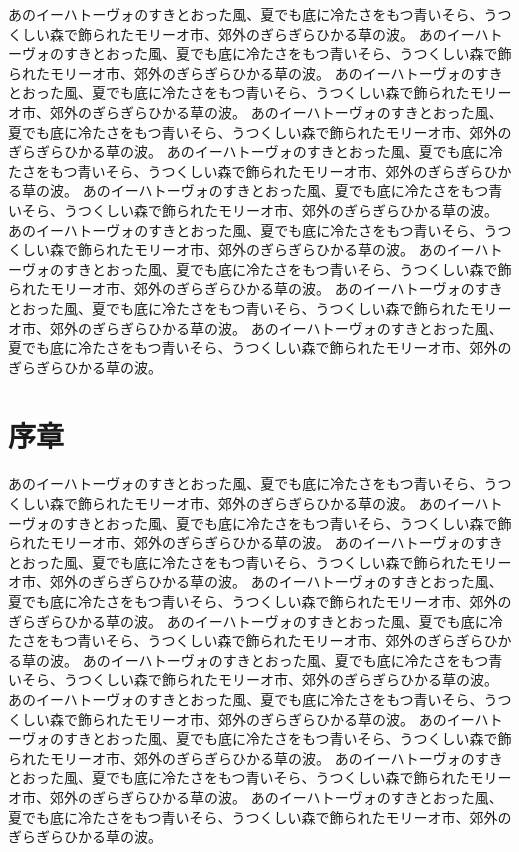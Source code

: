 \documentclass[b5j]{jsbook}
\begin{document}
あのイーハトーヴォのすきとおった風、夏でも底に冷たさをもつ青いそら、うつくしい森で飾られたモリーオ市、郊外のぎらぎらひかる草の波。
あのイーハトーヴォのすきとおった風、夏でも底に冷たさをもつ青いそら、うつくしい森で飾られたモリーオ市、郊外のぎらぎらひかる草の波。
あのイーハトーヴォのすきとおった風、夏でも底に冷たさをもつ青いそら、うつくしい森で飾られたモリーオ市、郊外のぎらぎらひかる草の波。
あのイーハトーヴォのすきとおった風、夏でも底に冷たさをもつ青いそら、うつくしい森で飾られたモリーオ市、郊外のぎらぎらひかる草の波。
あのイーハトーヴォのすきとおった風、夏でも底に冷たさをもつ青いそら、うつくしい森で飾られたモリーオ市、郊外のぎらぎらひかる草の波。
あのイーハトーヴォのすきとおった風、夏でも底に冷たさをもつ青いそら、うつくしい森で飾られたモリーオ市、郊外のぎらぎらひかる草の波。
あのイーハトーヴォのすきとおった風、夏でも底に冷たさをもつ青いそら、うつくしい森で飾られたモリーオ市、郊外のぎらぎらひかる草の波。
あのイーハトーヴォのすきとおった風、夏でも底に冷たさをもつ青いそら、うつくしい森で飾られたモリーオ市、郊外のぎらぎらひかる草の波。
あのイーハトーヴォのすきとおった風、夏でも底に冷たさをもつ青いそら、うつくしい森で飾られたモリーオ市、郊外のぎらぎらひかる草の波。
あのイーハトーヴォのすきとおった風、夏でも底に冷たさをもつ青いそら、うつくしい森で飾られたモリーオ市、郊外のぎらぎらひかる草の波。

\tableofcontents
\mainmatter
{}

\chapter{序章}

あのイーハトーヴォのすきとおった風、夏でも底に冷たさをもつ青いそら、うつくしい森で飾られたモリーオ市、郊外のぎらぎらひかる草の波。
あのイーハトーヴォのすきとおった風、夏でも底に冷たさをもつ青いそら、うつくしい森で飾られたモリーオ市、郊外のぎらぎらひかる草の波。
あのイーハトーヴォのすきとおった風、夏でも底に冷たさをもつ青いそら、うつくしい森で飾られたモリーオ市、郊外のぎらぎらひかる草の波。
あのイーハトーヴォのすきとおった風、夏でも底に冷たさをもつ青いそら、うつくしい森で飾られたモリーオ市、郊外のぎらぎらひかる草の波。
あのイーハトーヴォのすきとおった風、夏でも底に冷たさをもつ青いそら、うつくしい森で飾られたモリーオ市、郊外のぎらぎらひかる草の波。
あのイーハトーヴォのすきとおった風、夏でも底に冷たさをもつ青いそら、うつくしい森で飾られたモリーオ市、郊外のぎらぎらひかる草の波。
あのイーハトーヴォのすきとおった風、夏でも底に冷たさをもつ青いそら、うつくしい森で飾られたモリーオ市、郊外のぎらぎらひかる草の波。
あのイーハトーヴォのすきとおった風、夏でも底に冷たさをもつ青いそら、うつくしい森で飾られたモリーオ市、郊外のぎらぎらひかる草の波。
あのイーハトーヴォのすきとおった風、夏でも底に冷たさをもつ青いそら、うつくしい森で飾られたモリーオ市、郊外のぎらぎらひかる草の波。
あのイーハトーヴォのすきとおった風、夏でも底に冷たさをもつ青いそら、うつくしい森で飾られたモリーオ市、郊外のぎらぎらひかる草の波。
\end{document}
